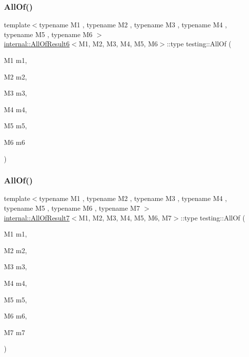 \subsubsection{\texorpdfstring{All\+Of()}{AllOf()}\hspace{0.1cm}{\footnotesize\ttfamily [5/9]}}
{\footnotesize\ttfamily template$<$typename M1 , typename M2 , typename M3 , typename M4 , typename M5 , typename M6 $>$ \\
\hyperlink{structtesting_1_1internal_1_1_all_of_result6}{internal\+::\+All\+Of\+Result6}$<$M1, M2, M3, M4, M5, M6$>$\+::type testing\+::\+All\+Of (\begin{DoxyParamCaption}\item[{M1}]{m1,  }\item[{M2}]{m2,  }\item[{M3}]{m3,  }\item[{M4}]{m4,  }\item[{M5}]{m5,  }\item[{M6}]{m6 }\end{DoxyParamCaption})\hspace{0.3cm}{\ttfamily [inline]}}

\mbox{\label{namespacetesting_acbd4eef50126ff6db5b93ac5faa71b45}} 
\subsubsection{\texorpdfstring{All\+Of()}{AllOf()}\hspace{0.1cm}{\footnotesize\ttfamily [6/9]}}
{\footnotesize\ttfamily template$<$typename M1 , typename M2 , typename M3 , typename M4 , typename M5 , typename M6 , typename M7 $>$ \\
\hyperlink{structtesting_1_1internal_1_1_all_of_result7}{internal\+::\+All\+Of\+Result7}$<$M1, M2, M3, M4, M5, M6, M7$>$\+::type testing\+::\+All\+Of (\begin{DoxyParamCaption}\item[{M1}]{m1,  }\item[{M2}]{m2,  }\item[{M3}]{m3,  }\item[{M4}]{m4,  }\item[{M5}]{m5,  }\item[{M6}]{m6,  }\item[{M7}]{m7 }\end{DoxyParamCaption})\hspace{0.3cm}{\ttfamily [inline]}}

